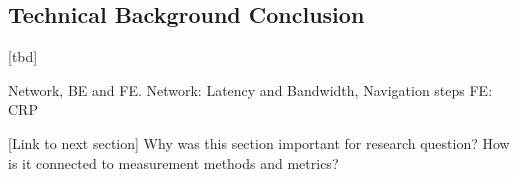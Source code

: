 \subsection{Technical Background Conclusion}

[tbd]

Network, BE and FE.
Network: Latency and Bandwidth, Navigation steps
FE: CRP

[Link to next section]
Why was this section important for research question?
How is it connected to measurement methods and metrics?












